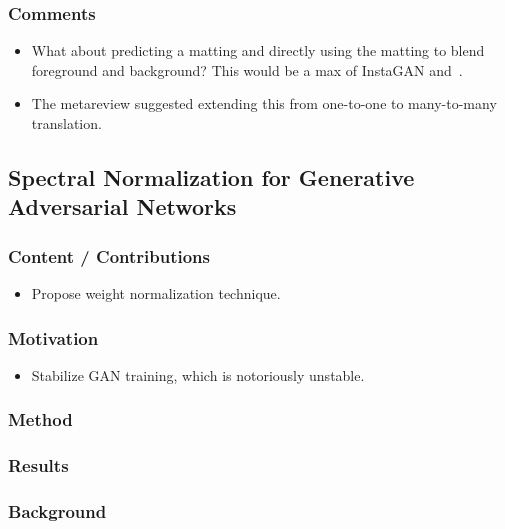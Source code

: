 \documentclass[a4paper, 12pt]{article}
\begin{document}
\subsubsection{Comments}

\begin{itemize}
        \item What about predicting a matting and directly using the matting to
                blend foreground and background? This would be a max of
                InstaGAN and~\cite{mejjati2018unsupervised}.

        \item The metareview suggested extending this from one-to-one to
                many-to-many translation.
\end{itemize}


\subsection{Spectral Normalization for Generative Adversarial
            Networks~\cite{miyato2018spectral}}

\subsubsection{Content / Contributions}

\begin{itemize}
\item Propose weight normalization technique.
\end{itemize}


\subsubsection{Motivation}

\begin{itemize}
\item Stabilize GAN training, which is notoriously unstable.
\end{itemize}


\subsubsection{Method}


\subsubsection{Results}


\subsubsection{Background}
\end{document}
